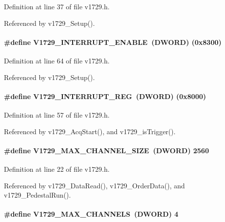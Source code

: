 Definition at line 37 of file v1729.h.

Referenced by v1729\_\-Setup().
\paragraph[{V1729\_\-INTERRUPT\_\-ENABLE}]{\setlength{\rightskip}{0pt plus 5cm}\#define V1729\_\-INTERRUPT\_\-ENABLE~({\bf DWORD}) (0x8300)}\hfill\label{v1729_8h_a2ccb13c13267bf3a3c0cef054862c5ca}


Definition at line 64 of file v1729.h.

Referenced by v1729\_\-Setup().
\paragraph[{V1729\_\-INTERRUPT\_\-REG}]{\setlength{\rightskip}{0pt plus 5cm}\#define V1729\_\-INTERRUPT\_\-REG~({\bf DWORD}) (0x8000)}\hfill\label{v1729_8h_ac2f5081ba8b1db6f0d5d14e2d234a6fa}


Definition at line 57 of file v1729.h.

Referenced by v1729\_\-AcqStart(), and v1729\_\-isTrigger().
\paragraph[{V1729\_\-MAX\_\-CHANNEL\_\-SIZE}]{\setlength{\rightskip}{0pt plus 5cm}\#define V1729\_\-MAX\_\-CHANNEL\_\-SIZE~({\bf DWORD}) 2560}\hfill\label{v1729_8h_a06a0901dbecbcf54eacc69244189a995}


Definition at line 22 of file v1729.h.

Referenced by v1729\_\-DataRead(), v1729\_\-OrderData(), and v1729\_\-PedestalRun().
\paragraph[{V1729\_\-MAX\_\-CHANNELS}]{\setlength{\rightskip}{0pt plus 5cm}\#define V1729\_\-MAX\_\-CHANNELS~({\bf DWORD}) 4}\hfill\label{v1729_8h_a4f551b05a881e4068d539fe1fbe426e5}


